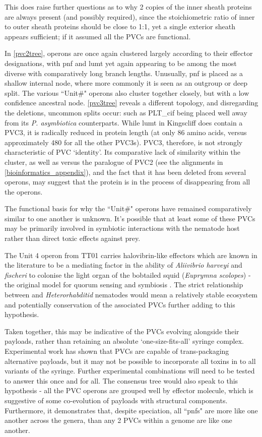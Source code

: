 This does raise further questions as to why 2 copies of the inner sheath proteins are always present (and possibly required), since the stoichiometric ratio of inner to outer sheath proteins should be close to 1:1, yet a single exterior sheath appears sufficient; if it assumed all the PVCs are functional.

In \vref{pvc2tree}, operons are once again clustered largely according to their effector designations, with pnf and lumt yet again appearing to be among the most diverse with comparatively long branch lengths. Unusually, pnf is placed as a shallow internal node, where more commonly it is seen as an outgroup or deep split. The various ``Unit\#" operons also cluster together closely, but with a low confidence ancestral node. \vref{pvc3tree} reveals a different topology, and disregarding the deletions, uncommon splits occur: such as PLT\_cif being placed well away from its \emph{P. asymbiotica} counterparts. While lumt in Kingscliff does contain a PVC3, it is radically reduced in protein length (at only 86 amino acids, versus approximately 480 for all the other PVC3s). PVC3, therefore, is not strongly characteristic of PVC `identity'. Its comparative lack of similarity within the cluster, as well as versus the paralogue of PVC2 (see the alignments in \vref{bioinformatics_appendix}), and the fact that it has been deleted from several operons, may suggest that the protein is in the process of disappearing from all the operons.

The functional basis for why the ``Unit\#" operons have remained comparatively similar to one another is unknown. It's possible that at least some of these PVCs may be primarily involved in symbiotic interactions with the nematode host rather than direct toxic effects against prey.

The Unit 4 operon from TT01 carries halovibrin-like effectors which are known in the literature to be a mediating factor in the ability of \emph{Aliivibrio harveyi} and \emph{fischeri} to colonise the light organ of the bobtailed squid (\emph{Euprymna scolopes}) - the original model for quorum sensing and symbiosis \citep{Ruby1999, Verma2013}. The strict relationship between \Pa{} and \emph{Heterorhabditid} nematodes would mean a relatively stable ecosystem and potentially conservation of the associated PVCs further adding to this hypothesis.

Taken together, this may be indicative of the PVCs evolving alongside their payloads, rather than retaining an absolute `one-size-fits-all' syringe complex. Experimental work has shown that PVCs are capable of trans-packaging alternative payloads, but it may not be possible to incorporate all toxins in to all variants of the syringe. Further experimental combinations will need to be tested to answer this once and for all. The consensus tree would also speak to this hypothesis - all the PVC operons are grouped well by effector molecule, which is suggestive of some co-evolution of payloads with structural components. Furthermore, it demonstrates that, despite speciation, all ``pnfs" are more like one another across the genera, than any 2 PVCs within a genome are like one another.

